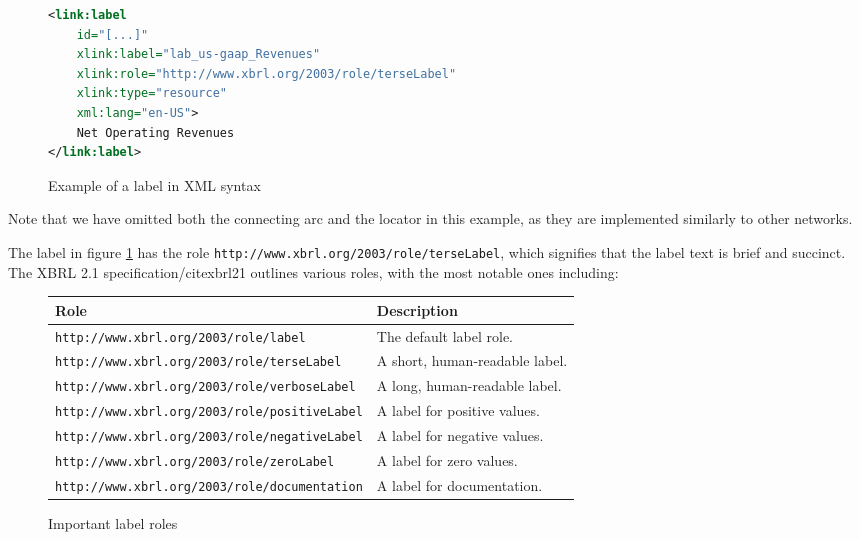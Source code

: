 \begin{figure}[H]
    \begin{lstlisting}[language=XML, basicstyle=\ttfamily\small]
<link:label 
    id="[...]" 
    xlink:label="lab_us-gaap_Revenues" 
    xlink:role="http://www.xbrl.org/2003/role/terseLabel" 
    xlink:type="resource" 
    xml:lang="en-US">
    Net Operating Revenues
</link:label>
\end{lstlisting}
    \caption{Example of a label in XML syntax}
    \label{fig:example_label_xml}
\end{figure}

Note that we have omitted both the connecting arc and the locator in this example, 
as they are implemented similarly to other networks.

The label in figure \ref{fig:example_label_xml} has the role \texttt{http://www.xbrl.org/2003/role/terseLabel},
which signifies that the label text is brief and succinct.
The XBRL 2.1 specification/cite{xbrl21} outlines various roles, with the most notable ones including:

\begin{figure}[H]
    \small
    \centering
    \begin{tabular}{|l|l|}
        \hline
        \textbf{Role} & \textbf{Description} \\ \hline
        \texttt{http://www.xbrl.org/2003/role/label} & The default label role. \\ \hline
        \texttt{http://www.xbrl.org/2003/role/terseLabel} & A short, human-readable label. \\ \hline
        \texttt{http://www.xbrl.org/2003/role/verboseLabel} & A long, human-readable label. \\ \hline
        \texttt{http://www.xbrl.org/2003/role/positiveLabel} & A label for positive values. \\ \hline
        \texttt{http://www.xbrl.org/2003/role/negativeLabel} & A label for negative values. \\ \hline
        \texttt{http://www.xbrl.org/2003/role/zeroLabel} & A label for zero values. \\ \hline
        \texttt{http://www.xbrl.org/2003/role/documentation} & A label for documentation. \\ \hline
    \end{tabular}
    \caption{Important label roles}
    \label{fig:important_label_roles}
\end{figure}


